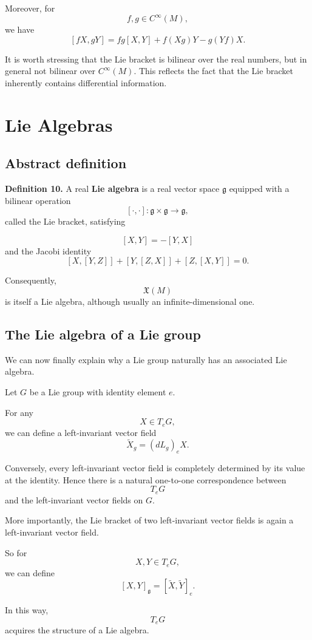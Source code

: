 \documentclass[11pt]{article}
\begin{document}
Moreover, for
\[
f,g\in C^\infty(M),
\]
we have
\[
[fX,gY]
=
fg[X,Y]
+
f(Xg)Y
-
g(Yf)X.
\]

It is worth stressing that the Lie bracket is bilinear over the real numbers, but in general not bilinear over $C^\infty(M)$. This reflects the fact that the Lie bracket inherently contains differential information.


\section{Lie Algebras}

\subsection{Abstract definition}

\textbf{Definition 10.}
A real \textbf{Lie algebra} is a real vector space $\mathfrak{g}$ equipped with a bilinear operation
\[
[\cdot,\cdot]:
\mathfrak{g}\times\mathfrak{g}
\to
\mathfrak{g},
\]
called the Lie bracket, satisfying

\[
[X,Y]=-[Y,X]
\]
and the Jacobi identity
\[
[X,[Y,Z]]
+
[Y,[Z,X]]
+
[Z,[X,Y]]
=
0.
\]

Consequently,
\[
\mathfrak{X}(M)
\]
is itself a Lie algebra, although usually an infinite-dimensional one.


\subsection{The Lie algebra of a Lie group}

We can now finally explain why a Lie group naturally has an associated Lie algebra.

Let $G$ be a Lie group with identity element $e$.

For any
\[
X\in T_eG,
\]
we can define a left-invariant vector field
\[
\widetilde{X}_g
=
(dL_g)_eX.
\]

Conversely, every left-invariant vector field is completely determined by its value at the identity. Hence there is a natural one-to-one correspondence between
\[
T_eG
\]
and the left-invariant vector fields on $G$.

More importantly, the Lie bracket of two left-invariant vector fields is again a left-invariant vector field.

So for
\[
X,Y\in T_eG,
\]
we can define
\[
[X,Y]_{\mathfrak g}
=
[\widetilde X,\widetilde Y]_e.
\]

In this way,
\[
T_eG
\]
acquires the structure of a Lie algebra.
\end{document}
